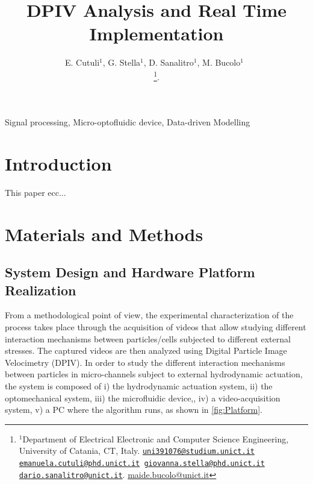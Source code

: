 \documentclass[journal]{IEEEtran}
\title{DPIV Analysis and Real Time Implementation}
\author{E. Cutuli${^{1}}$, G. Stella${^{1}}$, D. Sanalitro${^{1}}$, M. Bucolo${^{1}}$~\IEEEmembership{Senior Member,~IEEE}

\thanks{$^1$Department of Electrical Electronic and Computer Science Engineering, University of Catania, CT, Italy. {\tt \scriptsize\href{mailto:uni391076@studium.unict.it}{\mbox{uni391076@studium.unict.it}}
\scriptsize\href{mailto:emaunuela.cutuli@phd.unict.it}{\mbox{emanuela.cutuli@phd.unict.it}}
\scriptsize\href{mailto:giovanna.stella@phd.unict.it}{\mbox{giovanna.stella@phd.unict.it}}
\scriptsize\href{mailto:dario.sanalitro@unict.it}{\mbox{dario.sanalitro@unict.it}}}. 
\scriptsize\href{mailto:maide.bucolo@unict.it}{\mbox{maide.bucolo@unict.it}}}. 
}
\theoremstyle{definition}
\theoremstyle{remark}
\begin{document}


\maketitle

\begin{abstract}

\end{abstract}

\begin{IEEEkeywords}
	Signal processing, Micro-optofluidic device, Data-driven Modelling
\end{IEEEkeywords}

\section{Introduction}

This paper ecc...



\section{Materials and Methods}

\subsection{System Design and Hardware Platform Realization}\label{sec:design}



From a methodological point of view, the experimental characterization of the process takes place through the acquisition of videos that allow studying different interaction mechanisms between particles/cells subjected to different external stresses.
The captured videos are then analyzed using Digital Particle Image Velocimetry (DPIV).
In order to study the different interaction mechanisms between particles in micro-channels subject to external hydrodynamic actuation, the system is composed of i) the hydrodynamic actuation system, ii) the optomechanical system, iii) the microfluidic device,, iv) a video-acquisition system, v)  a PC where the algorithm runs, as shown in \fig\ref{fig:Platform}.

\end{document}
